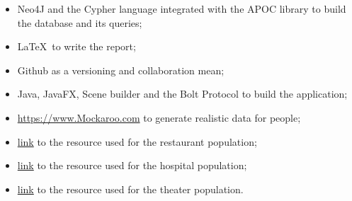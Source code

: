 \documentclass[12pt, a4paper]{article}
\begin{document}
\begin{itemize}
    \item Neo4J and the Cypher language integrated with the APOC library 
        to build the database and its queries;
    \item \LaTeX~to write the report;
    \item Github as a versioning and collaboration mean;
    \item Java, JavaFX, Scene builder and the Bolt Protocol to build 
        the application;
    \item \url{https://www.Mockaroo.com} 
        to generate realistic data for people;
    \item \href{https://github.com/DataScienceSpecialization/courses/blob/master/03_GettingData/03_02_summarizingData/data/restaurants.csv}{link}
        to the resource used for the restaurant population;
    \item \href{https://corgis-edu.github.io/corgis/csv/hospitals/}{link}
        to the resource used for the hospital population;
    \item \href{https://github.com/planekid/moviepass/blob/master/theaters.csv}{link}
        to the resource used for the theater population.
\end{itemize}

\clearpage
\end{document}
